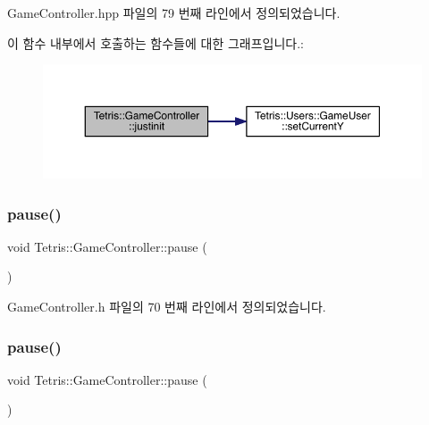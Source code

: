 Game\+Controller.\+hpp 파일의 79 번째 라인에서 정의되었습니다.

이 함수 내부에서 호출하는 함수들에 대한 그래프입니다.\+:
\nopagebreak
\begin{figure}[H]
\begin{center}
\leavevmode
\includegraphics[width=350pt]{class_tetris_1_1_game_controller_aef406397d4719c9edd49774d0343ce05_cgraph}
\end{center}
\end{figure}
\mbox{\label{class_tetris_1_1_game_controller_a1f55b577248e34b4e0902ce114610edd}} 
\subsubsection{\texorpdfstring{pause()}{pause()}\hspace{0.1cm}{\footnotesize\ttfamily [1/2]}}
{\footnotesize\ttfamily void Tetris\+::\+Game\+Controller\+::pause (\begin{DoxyParamCaption}{ }\end{DoxyParamCaption})\hspace{0.3cm}{\ttfamily [inline]}}



Game\+Controller.\+h 파일의 70 번째 라인에서 정의되었습니다.

\mbox{\label{class_tetris_1_1_game_controller_a1f55b577248e34b4e0902ce114610edd}} 
\subsubsection{\texorpdfstring{pause()}{pause()}\hspace{0.1cm}{\footnotesize\ttfamily [2/2]}}
{\footnotesize\ttfamily void Tetris\+::\+Game\+Controller\+::pause (\begin{DoxyParamCaption}{ }\end{DoxyParamCaption})\hspace{0.3cm}{\ttfamily [inline]}}



